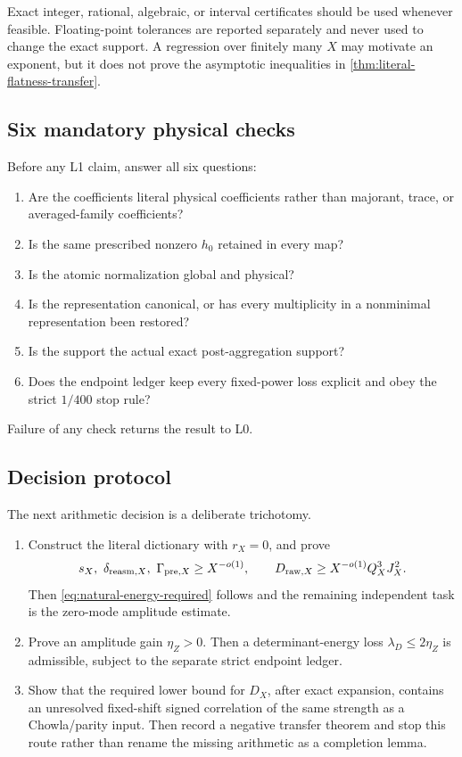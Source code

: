 Exact integer, rational, algebraic, or interval certificates should be
used whenever feasible.  Floating-point tolerances are reported
separately and never used to change the exact support.  A regression
over finitely many \(X\) may motivate an exponent, but it does not
prove the asymptotic inequalities in
\cref{thm:literal-flatness-transfer}.

\subsection{Six mandatory physical checks}

Before any L1 claim, answer all six questions:
\begin{enumerate}[label=(C\arabic*),leftmargin=2.7em]
\item Are the coefficients literal physical coefficients rather than
majorant, trace, or averaged-family coefficients?
\item Is the same prescribed nonzero \(h_0\) retained in every map?
\item Is the atomic normalization global and physical?
\item Is the representation canonical, or has every multiplicity in a
nonminimal representation been restored?
\item Is the support the actual exact post-aggregation support?
\item Does the endpoint ledger keep every fixed-power loss explicit
and obey the strict \(1/400\) stop rule?
\end{enumerate}
Failure of any check returns the result to L0.

\subsection{Decision protocol}

The next arithmetic decision is a deliberate trichotomy.

\begin{enumerate}[label=\textbf{Route \Alph*.},leftmargin=3.5em]
\item Construct the literal dictionary with \(r_X=0\), and prove
\[
 s_X,\ \delta_{{\rm reasm},X},\ \Gamma_{{\rm pre},X}
 \ge X^{-o(1)},
 \qquad
 D_{{\rm raw},X}\ge X^{-o(1)}Q_X^3J_X^2.
\]
Then \eqref{eq:natural-energy-required} follows and the remaining
independent task is the zero-mode amplitude estimate.
\item Prove an amplitude gain
\(\eta_Z>0\).  Then a determinant-energy loss
\(\lambda_D\le2\eta_Z\) is admissible, subject to the separate strict
endpoint ledger.
\item Show that the required lower bound for \(D_X\), after exact
expansion, contains an unresolved fixed-shift signed correlation of
the same strength as a Chowla/parity input.  Then record a negative
transfer theorem and stop this route rather than rename the missing
arithmetic as a completion lemma.
\end{enumerate}

